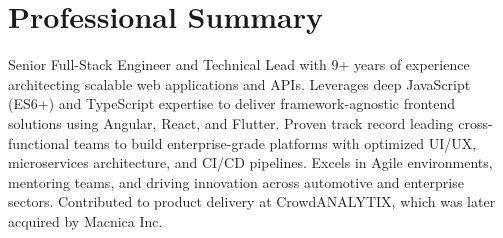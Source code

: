 \vspace{-0.6em}
\section{Professional Summary}
\noindent \normalsize Senior Full-Stack Engineer and Technical Lead with 9+ years of experience architecting scalable web applications and APIs. Leverages deep JavaScript (ES6+) and TypeScript expertise to deliver framework-agnostic frontend solutions using Angular, React, and Flutter. Proven track record leading cross-functional teams to build enterprise-grade platforms with optimized UI/UX, microservices architecture, and CI/CD pipelines. Excels in Agile environments, mentoring teams, and driving innovation across automotive and enterprise sectors.
Contributed to product delivery at CrowdANALYTIX, which was later acquired by Macnica Inc.
\nopagebreak[4]